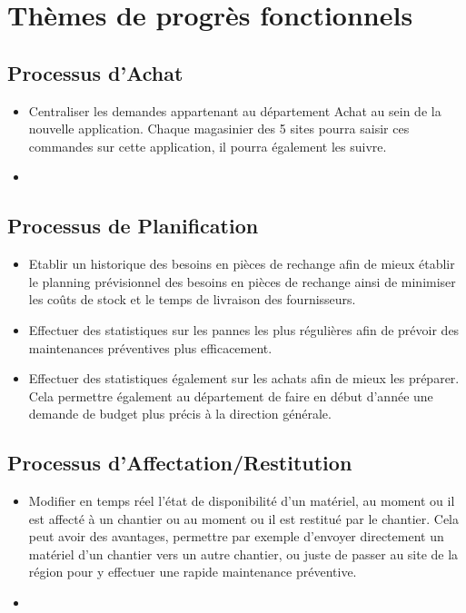 \section{Thèmes de progrès fonctionnels}
        \subsection{Processus d'Achat}
        \begin{itemize}
                \item Centraliser les demandes appartenant au département Achat au sein de la nouvelle application. Chaque magasinier des 5 sites pourra saisir ces commandes sur cette application, il pourra également les suivre.
                \item 
        \end{itemize}

        \subsection{Processus de Planification}
        \begin{itemize}
                \item Etablir un historique des besoins en pièces de rechange afin de mieux établir le planning prévisionnel des besoins en pièces de rechange ainsi de minimiser les coûts de stock et le temps de livraison des fournisseurs.
                \item Effectuer des statistiques sur les pannes les plus régulières afin de prévoir des maintenances préventives plus efficacement.
                \item Effectuer des statistiques également sur les achats afin de mieux les préparer. Cela permettre également au département de faire en début d'année une demande de budget plus précis à la direction générale.
        \end{itemize}

        \subsection{Processus d'Affectation/Restitution}
        \begin{itemize}
                \item Modifier en temps réel l'état de disponibilité d'un matériel, au moment ou il est affecté à un chantier ou au moment ou il est restitué par le chantier. Cela peut avoir des avantages, permettre par exemple d'envoyer directement un matériel d'un chantier vers un autre chantier, ou juste de passer au site de la région pour y effectuer une rapide maintenance préventive.
                \item 
        \end{itemize}

